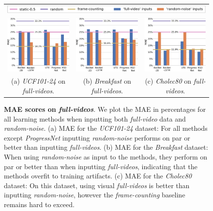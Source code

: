 \begin{figure}
\centering
    \begin{tabular}{ccc}
    \multicolumn{3}{c}{\includegraphics[width=.8\linewidth]{media/results/legend_full2.pdf}} \\
    \includegraphics[width=0.31\linewidth]{media/results/ucf_full-1.pdf} & 
    \includegraphics[width=0.31\linewidth]{media/results/breakfast_full-1.pdf} &
    \includegraphics[width=0.31\linewidth]{media/results/cholec_full-1.pdf} \\
    {\small (a) \textsl{UCF101-24} on \textsl{full-videos}.} &
    {\small (b) \textsl{Breakfast} on \textsl{full-videos}.} &
    {\small (c) \textsl{Cholec80} on \textsl{full-videos}.} \\
    \end{tabular}
   \caption{\textbf{MAE scores on \textsl{full-videos}}. 
       We plot the MAE in percentages for all learning methods when inputting both \textsl{full-video} data and \textsl{random-noise}. 
       (a) MAE for the \textsl{UCF101-24} dataset: For all methods except \textsl{ProgressNet} inputting \textsl{random-noise} performs on par or better than inputting \textsl{full-videos}.
       (b) MAE for the \textsl{Breakfast} dataset: When using \textsl{random-noise} as input to the methods, they perform on par or better than when inputting \textsl{full-videos}, indicating that the methods overfit to training artifacts.
       (c) MAE for the \textsl{Cholec80} dataset: On this dataset, using visual \textsl{full-videos} is better than inputting \textsl{random-noise}, however the \textsl{frame-counting} baseline remains hard to exceed.
   }
\label{fig:full}
\end{figure}
